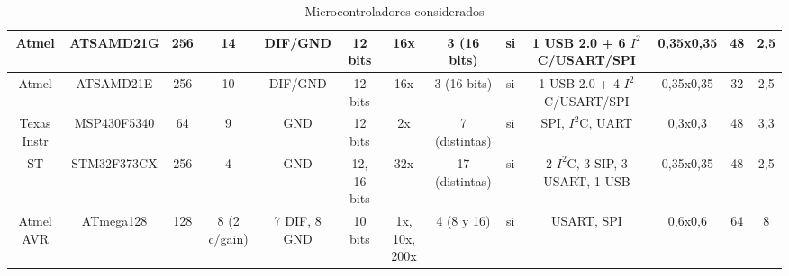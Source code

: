 \documentclass{article}
\theoremstyle{definition}
\theoremstyle{remark}
\begin{document}
\begin{landscape}
\begin{table}[!]
\begin{flushleft}
{\begin{tabular}{|c|c|c|c|c|c|c|c|c|c|c|c|c|}
\hline
 Atmel & ATSAMD21G &    256 &     14 & DIF/GND & 12 bits &    16x & 3 (16 bits) &     si & 1 USB 2.0 + 6 $I^{2}$C/USART/SPI & 0,35x0,35 &     48 &    2,5 \\
\hline
 Atmel & ATSAMD21E &    256 &     10 & DIF/GND & 12 bits &    16x & 3 (16 bits) &     si & 1 USB 2.0 + 4 $I^{2}$C/USART/SPI & 0,35x0,35 &     32 &    2,5 \\
\hline
Texas Instr & MSP430F5340 &     64 &      9 &    GND & 12 bits &     2x & 7 (distintas) &     si & SPI, $I^{2}$C, UART & 0,3x0,3 &     48 &    3,3 \\
\hline
    ST & STM32F373CX &    256 &      4 &    GND & 12, 16 bits &    32x & 17 (distintas) &     si & 2 $I^{2}$C, 3 SIP, 3 USART, 1 USB & 0,35x0,35 &     48 &    2,5 \\
\hline
Atmel AVR & ATmega128 &    128 & 8 (2 c/gain) & 7 DIF, 8 GND & 10 bits & 1x, 10x, 200x & 4 (8 y 16) &     si & USART, SPI & 0,6x0,6 &     64 &      8 \\
\hline
\end{tabular}



}
\end{flushleft}
  \caption{Microcontroladores considerados}\label{tabla_micros}
\end{table}

\end{landscape}
\end{document}
